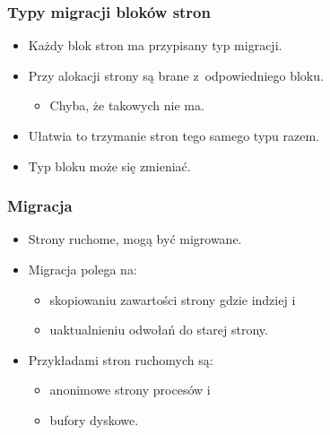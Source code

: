 \begin{frame}[fragile]
  \frametitle{Typy migracji bloków stron}

  \begin{itemize}
  \item Każdy blok stron ma przypisany typ migracji.
  \item Przy alokacji strony są brane z~odpowiedniego bloku.
    \begin{itemize}
    \item Chyba, że takowych nie ma.
    \end{itemize}
  \item Ułatwia to trzymanie stron tego samego typu razem.
  \item Typ bloku może się zmieniać.
  \end{itemize}
\end{frame}

\begin{frame}[fragile]
  \frametitle{Migracja}

  \begin{itemize}
  \item Strony ruchome, mogą być migrowane.
  \item Migracja polega na:
    \begin{itemize}
    \item skopiowaniu zawartości strony gdzie indziej i
    \item uaktualnieniu odwołań do starej strony.
    \end{itemize}
  \item Przykładami stron ruchomych są:
    \begin{itemize}
    \item anonimowe strony procesów i
    \item bufory dyskowe.
    \end{itemize}
  \end{itemize}
\end{frame}

